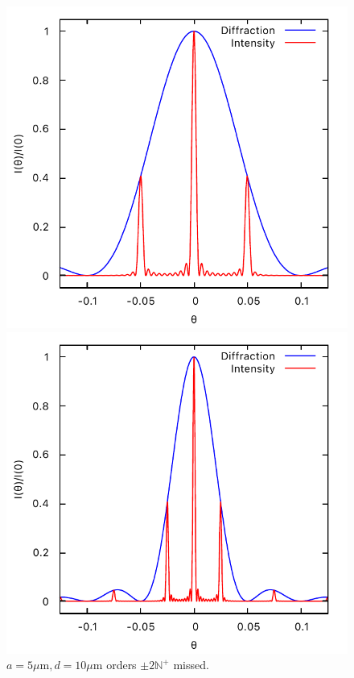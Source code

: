 \documentclass[11pt, twoside]{article}   	%
\theoremstyle{plain}
\theoremstyle{definition}
\begin{document}
\begin{description}
	\begin{figure}[htbp]
		\begin{minipage}[t]{0.33\linewidth}
		\centering
		\includegraphics[width=0.9\linewidth]{5-10}
		\caption{\centering $a = 5\mu\mathrm{m}, d = 10\mu\mathrm{m}$
			\newline orders $\pm 2\mathbb N^+$ missed.}
		\end{minipage}
		\begin{minipage}[t]{0.33\linewidth}
		\centering
		\includegraphics[width=0.9\linewidth]{10-20}

\end{minipage}
\end{figure}
\end{description}
\end{document}
